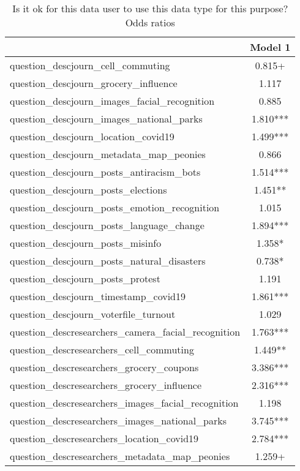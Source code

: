 \begin{table}

\caption{Is it ok for this data user to use this data type for this purpose? Odds ratios}
\centering
\begin{tabular}[t]{lc}
\toprule
  & Model 1\\
\midrule
question\_descjourn\_cell\_commuting & \num{0.815}+\\
question\_descjourn\_grocery\_influence & \num{1.117}\\
question\_descjourn\_images\_facial\_recognition & \num{0.885}\\
question\_descjourn\_images\_national\_parks & \num{1.810}***\\
question\_descjourn\_location\_covid19 & \num{1.499}***\\
question\_descjourn\_metadata\_map\_peonies & \num{0.866}\\
question\_descjourn\_posts\_antiracism\_bots & \num{1.514}***\\
question\_descjourn\_posts\_elections & \num{1.451}**\\
question\_descjourn\_posts\_emotion\_recognition & \num{1.015}\\
question\_descjourn\_posts\_language\_change & \num{1.894}***\\
question\_descjourn\_posts\_misinfo & \num{1.358}*\\
question\_descjourn\_posts\_natural\_disasters & \num{0.738}*\\
question\_descjourn\_posts\_protest & \num{1.191}\\
question\_descjourn\_timestamp\_covid19 & \num{1.861}***\\
question\_descjourn\_voterfile\_turnout & \num{1.029}\\
question\_descresearchers\_camera\_facial\_recognition & \num{1.763}***\\
question\_descresearchers\_cell\_commuting & \num{1.449}**\\
question\_descresearchers\_grocery\_coupons & \num{3.386}***\\
question\_descresearchers\_grocery\_influence & \num{2.316}***\\
question\_descresearchers\_images\_facial\_recognition & \num{1.198}\\
question\_descresearchers\_images\_national\_parks & \num{3.745}***\\
question\_descresearchers\_location\_covid19 & \num{2.784}***\\
question\_descresearchers\_metadata\_map\_peonies & \num{1.259}+\\

\end{tabular}
\end{table}
